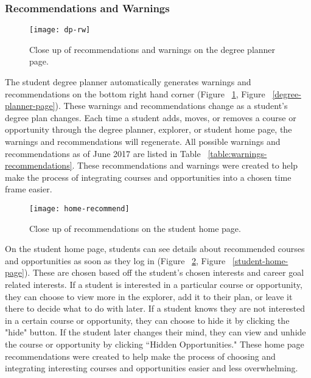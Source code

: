 \subsubsection{Recommendations and Warnings}

\begin{figure}[htbp!]
\centering
\texttt{[image: dp-rw]}
\caption{Close up of recommendations and warnings on the degree planner page.}
\label{recommendations-warnings}
\end{figure}

The student degree planner automatically generates warnings and recommendations on the bottom right hand corner (Figure ~\ref{recommendations-warnings}, Figure ~\ref{degree-planner-page}). These warnings and recommendations change as a student's degree plan changes. Each time a student adds, moves, or removes a course or opportunity through the degree planner, explorer, or student home page, the warnings and recommendations will regenerate. All possible warnings and recommendations as of June 2017 are listed in Table ~\ref{table:warnings-recommendations}. These recommendations and warnings were created to help make the process of integrating courses and opportunities into a chosen time frame easier.

\begin{figure}[htbp!]
\centering
\texttt{[image: home-recommend]}
\caption{Close up of recommendations on the student home page.}
\label{home-recommend}
\end{figure}

On the student home page, students can see details about recommended courses and opportunities as soon as they log in (Figure ~\ref{home-recommend}, Figure ~\ref{student-home-page}). These are chosen based off the student's chosen interests and career goal related interests. If a student is interested in a particular course or opportunity, they can choose to view more in the explorer, add it to their plan, or leave it there to decide what to do with later. If a student knows they are not interested in a certain course or opportunity, they can choose to hide it by clicking the "hide" button. If the student later changes their mind, they can view and unhide the course or opportunity by clicking ``Hidden Opportunities." These home page recommendations were created to help make the process of choosing and integrating interesting courses and opportunities easier and less overwhelming.


